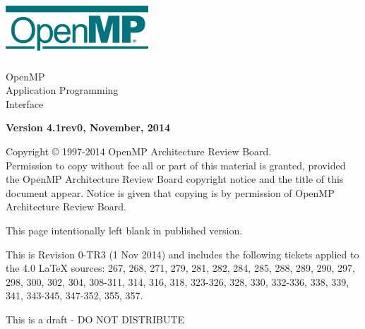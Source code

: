 
  \begin{titlepage}
    \begin{flushleft}
     \hspace{-6em} \includegraphics[width=0.4\textwidth]{openmp-logo.png}
    \end{flushleft}

    \begin{adjustwidth}{-0.75in}{0in}
    \begin{center}
      \Huge
      \textsf{OpenMP\\Application Programming\\Interface}

      \vspace{0.5in}\textsf{    }\vspace{-0.7in}
      \normalsize

      \vspace{1.0in}

      \textbf{Version 4.1rev0, November, 2014}
    \end{center}
    \end{adjustwidth}

    \vspace{3.0in}

\begin{adjustwidth}{0pt}{1em}\setlength{\parskip}{0.25\baselineskip}%
Copyright © 1997-2014 OpenMP Architecture Review Board.\\
Permission to copy without fee all or part of this material is granted,
provided the OpenMP Architecture Review Board copyright notice and
the title of this document appear. Notice is given that copying is by
permission of OpenMP Architecture Review Board.\end{adjustwidth}

  \end{titlepage}


\clearpage
\thispagestyle{empty}
\phantom{a}
This page intentionally left blank in published version.

This is Revision 0-TR3 (1 Nov 2014) and includes the following tickets applied to the 4.0 LaTeX sources:
267, 268, 271, 279, 281, 282, 284, 285, 288, 289, 290, 297, 298, 300, 302, 304, 308-311, 314, 316, 318, 323-326, 328, 330, 332-336, 338, 339, 341, 343-345, 347-352, 355, 357. 

This is a draft - DO NOT DISTRIBUTE
\vfill

